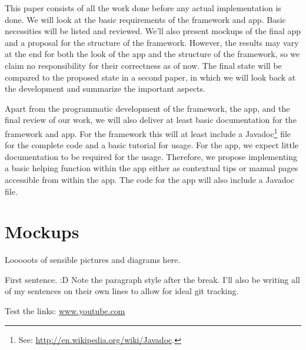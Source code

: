 \documentclass[a4paper]{article}
\begin{document}
This paper consists of all the work done before any actual implementation is done.
We will look at the basic requirements of the framework and app.
Basic necessities will be listed and reviewed.
We'll also present mockups of the final app and a proposal for the structure of the framework.
However, the results may vary at the end for both the look of the app and the structure of the framework, so we claim no responsibility for their correctness as of now.
The final state will be compared to the proposed state in a second paper, in which we will look back at the development and summarize the important aspects.

Apart from the programmatic development of the framework, the app, and the final review of our work, we will also deliver at least basic documentation for the framework and app.
For the framework this will at least include a Javadoc\footnote{See: \url{http://en.wikipedia.org/wiki/Javadoc}.} file for the complete code and a basic tutorial for usage.
For the app, we expect little documentation to be required for the usage.
Therefore, we propose implementing a basic helping function within the app either as contextual tips or manual pages accessible from within the app.
The code for the app will also include a Javadoc file.

\section{Mockups}

Looooots of sensible pictures and diagrams here.

First sentence. :D
Note the paragraph style after the break.
I'll also be writing all of my sentences on their own lines to allow for ideal git tracking.

Test the links: \url{www.youtube.com}

\newpage

\end{document}
